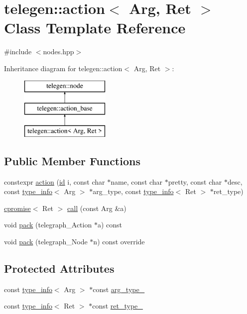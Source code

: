\hypertarget{classtelegen_1_1action}{}\section{telegen\+:\+:action$<$ Arg, Ret $>$ Class Template Reference}
\label{classtelegen_1_1action}


{\ttfamily \#include $<$nodes.\+hpp$>$}

Inheritance diagram for telegen\+:\+:action$<$ Arg, Ret $>$\+:\begin{figure}[H]
\begin{center}
\leavevmode
\includegraphics[height=3.000000cm]{classtelegen_1_1action}
\end{center}
\end{figure}
\subsection*{Public Member Functions}
\begin{DoxyCompactItemize}
\item 
constexpr \hyperlink{classtelegen_1_1action_abb0b9cd50183ff3125d9056585db7571}{action} (\hyperlink{classtelegen_1_1node_aae3ff0d12932c55fdc88a1743e27ea56}{id} i, const char $\ast$name, const char $\ast$pretty, const char $\ast$desc, const \hyperlink{structtelegen_1_1type__info}{type\+\_\+info}$<$ Arg $>$ $\ast$arg\+\_\+type, const \hyperlink{structtelegen_1_1type__info}{type\+\_\+info}$<$ Ret $>$ $\ast$ret\+\_\+type)
\item 
\hyperlink{namespacetelegen_a73ca2c44e7e302c2405f99a28e35acb7}{cpromise}$<$ Ret $>$ \hyperlink{classtelegen_1_1action_aebcc7f33d0abdbace3d893ef1ea07a6a}{call} (const Arg \&a)
\item 
void \hyperlink{classtelegen_1_1action_af6b57000174dc90257d52261cc9ef444}{pack} (telegraph\+\_\+\+Action $\ast$a) const
\item 
void \hyperlink{classtelegen_1_1action_a0e5686b3bf433afab1b0fda1002f95b0}{pack} (telegraph\+\_\+\+Node $\ast$n) const override
\end{DoxyCompactItemize}
\subsection*{Protected Attributes}
\begin{DoxyCompactItemize}
\item 
const \hyperlink{structtelegen_1_1type__info}{type\+\_\+info}$<$ Arg $>$ $\ast$const \hyperlink{classtelegen_1_1action_ae81a51a3863b0aa3c8f5bd6eab375681}{arg\+\_\+type\+\_\+}
\item 
const \hyperlink{structtelegen_1_1type__info}{type\+\_\+info}$<$ Ret $>$ $\ast$const \hyperlink{classtelegen_1_1action_a1e2cfbe4fec7d4c392be9d7e3d2390dc}{ret\+\_\+type\+\_\+}
\end{DoxyCompactItemize}
